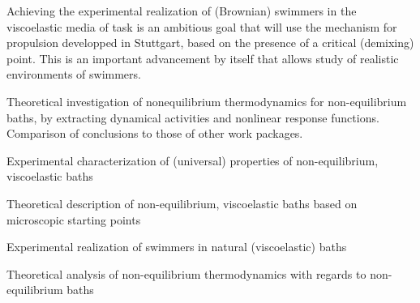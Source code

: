 \begin{workpackage}
\begin{tasklist}
\begin{task}[title=Experimental realization of (Brownian) swimmers,id=brown-t2,PM=24,lead=USTUTT,wphases=24-48!1.0]
Achieving the experimental realization of (Brownian) swimmers in the viscoelastic media of
task  is an ambitious goal that will use the mechanism for propulsion
developped in Stuttgart, based on the presence of a critical (demixing) point. This is an
important advancement by itself that allows study of realistic environments of swimmers.

Theoretical investigation of nonequilibrium thermodynamics for non-equilibrium baths, by
extracting dynamical activities and nonlinear response functions. Comparison of conclusions
to those of other work packages.
\end{task}

\end{tasklist}

\begin{wpdelivs}
  \begin{wpdeliv}[due=24,id=brown-d1,dissem=PU,nature=DEM,lead=USTUTT]
      {Experimental characterization of (universal) properties of non-equilibrium, viscoelastic baths}
  \end{wpdeliv}
  \begin{wpdeliv}[due=24,id=brown-d2,dissem=PU,nature=DEM,lead=USTUTT]
      {Theoretical description of non-equilibrium, viscoelastic baths based on microscopic starting points}
\end{wpdeliv}
  \begin{wpdeliv}[due=48,id=brown-d3,dissem=PU,nature=DEM,lead=USTUTT]
      {Experimental realization of swimmers in natural (viscoelastic) baths}
\end{wpdeliv}
\begin{wpdeliv}[due=48,id=brown-d4,dissem=PU,nature=DEM,lead=USTUTT]
      {Theoretical analysis of non-equilibrium thermodynamics with regards to non-equilibrium baths}
\end{wpdeliv}
\end{wpdelivs}

\end{workpackage}
